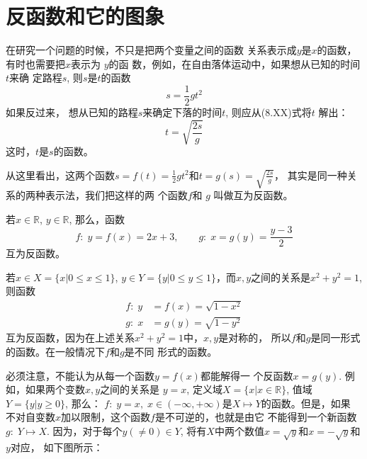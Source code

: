 \begin{example}
    
\end{example}

\begin{solution}
    
\end{solution}

\section{反函数和它的图象}

在研究一个问题的时候，不只是把两个变量之间的函数
关系表示成$y$是$x$的函数，有时也需要把$x$表示为 $y$的函
数，例如，在自由落体运动中，如果想从已知的时间$t$来确
定路程$s$, 则$s$是$t$的函数
\begin{equation}
    s=\frac{1}{2}gt^2
\end{equation}
如果反过来，
想从已知的路程$s$来确定下落的时间$t$, 则应从(8.XX)式将$t$
解出：
\begin{equation}
    t=\sqrt{\frac{2s}{g}}
\end{equation}
这时，$t$是$s$的函数。

从这里看出，这两个函数$s=f(t)=\frac{1}{2}gt^2$和$t=g(s)=
\sqrt{\frac{2s}{g}}$，
其实是同一种关系的两种表示法，我们把这样的两
个函数$f$和
$g$ 叫做互为反函数。

\begin{example}
    若$x\in\mathbb{R}$, $y\in\mathbb{R}$, 那么，函数
\[f:\; y=f(x)=2x+3,\qquad g:\; x=g(y)=\frac{y-3}{2}\]
互为反函数。
\end{example}


\begin{example}
 若$x\in X=\{x|0\le x\le 1\}$, $y\in Y=\{y|0\le y\le 1\}$，而$x,y$之间的关系是$x^2+y^2=1$, 则函数
\[\begin{split}
  f:\; y&=f(x)=\sqrt{1-x^2}\\
g:\; x&=g(y)=\sqrt{1-y^2}   
\end{split}\]
互为反函数，因为在上述关系$x^2+y^2=1$中，$x,y$是对称的，
所以$f$和$g$是同一形式的函数。在一般情况下$f$和$g$是不同
形式的函数。
\end{example}

必须注意，不能认为从每一个函数$y=f(x)$都能解得一
个反函数$x=g(y)$. 例如，如果两个变数$x,y$之间的关系是
$y=x$, 定义域$X=\{x|x\in\mathbb{R}\}$, 值域$Y=\{y|y\ge 0\}$, 那么：
$f:\; y=x,\; x\in (-\infty,+\infty)$是$X\mapsto Y$的函数。但是，如果
不对自变数$x$加以限制，这个函数$f$是不可逆的，也就是由它
不能得到一个新函数$g:\; Y\mapsto X$. 因为，对于每个$y(\ne 0)\in Y$, 
将有$X$中两个数值$x=\sqrt{y}$和$x=-\sqrt{y}$和$y$对应，
如下图所示：

